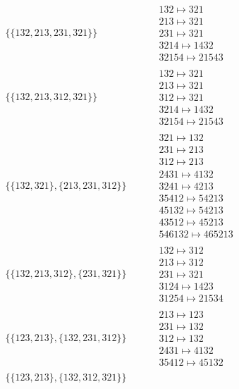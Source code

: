 \begin{tiny}
\begin{align}
\{\{132, 213, 231, 321\}\}
\quad
&
\phantom{.}
&
\begin{matrix}
132 \mapsto 321\\213 \mapsto 321\\231 \mapsto 321\\3214 \mapsto 1432\\32154 \mapsto 21543
\end{matrix}
\\
\{\{132, 213, 312, 321\}\}
\quad
&
\phantom{.}
&
\begin{matrix}
132 \mapsto 321\\213 \mapsto 321\\312 \mapsto 321\\3214 \mapsto 1432\\32154 \mapsto 21543
\end{matrix}
\\
\{\{132, 321\}, \{213, 231, 312\}\}
\quad
&
\phantom{.}
&
\begin{matrix}
321 \mapsto 132\\231 \mapsto 213\\312 \mapsto 213\\2431 \mapsto 4132\\3241 \mapsto 4213\\35412 \mapsto 54213\\45132 \mapsto 54213\\43512 \mapsto 45213\\546132 \mapsto 465213
\end{matrix}
\\
\{\{132, 213, 312\}, \{231, 321\}\}
\quad
&
\phantom{.}
&
\begin{matrix}
132 \mapsto 312\\213 \mapsto 312\\231 \mapsto 321\\3124 \mapsto 1423\\31254 \mapsto 21534
\end{matrix}
\\
\{\{123, 213\}, \{132, 231, 312\}\}
\quad
&
\phantom{.}
&
\begin{matrix}
213 \mapsto 123\\231 \mapsto 132\\312 \mapsto 132\\2431 \mapsto 4132\\35412 \mapsto 45132
\end{matrix}
\\
\{\{123, 213\}, \{132, 312, 321\}\}
\quad
&
\phantom{.}
&
\begin{matrix}

\end{matrix}
\end{align}
\end{tiny}
